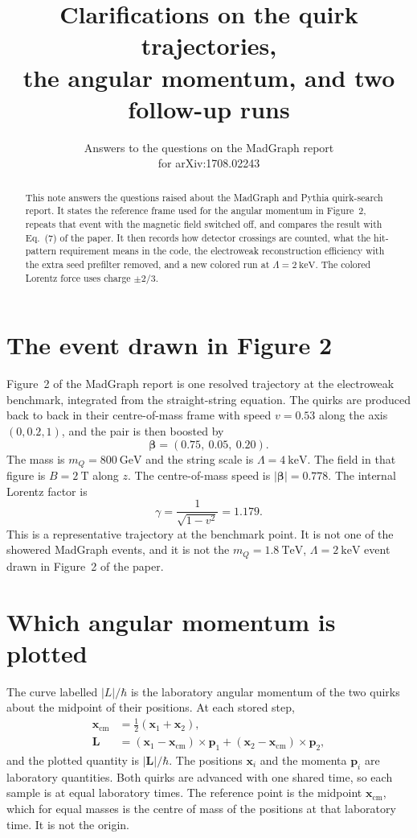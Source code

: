 \documentclass[11pt,a4paper]{article}
\title{Clarifications on the quirk trajectories,\\ the angular momentum, and two follow-up runs}
\author{Answers to the questions on the MadGraph report\\ for arXiv:1708.02243}
\date{}
\begin{document}
\maketitle

\begin{abstract}
This note answers the questions raised about the MadGraph and Pythia quirk-search report.
It states the reference frame used for the angular momentum in Figure~2, repeats that event with the magnetic field switched off, and compares the result with Eq.~(7) of the paper.
It then records how detector crossings are counted, what the hit-pattern requirement means in the code, the electroweak reconstruction efficiency with the extra seed prefilter removed, and a new colored run at \(\Lambda = \SI{2}{\keV}\).
The colored Lorentz force uses charge \(\pm 2/3\).
\end{abstract}

\section{The event drawn in Figure 2}
Figure~2 of the MadGraph report is one resolved trajectory at the electroweak benchmark, integrated from the straight-string equation.
The quirks are produced back to back in their centre-of-mass frame with speed \(v = 0.53\) along the axis \((0, 0.2, 1)\), and the pair is then boosted by
\[
\boldsymbol{\beta} = (0.75,\ 0.05,\ 0.20).
\]
The mass is \(m_Q = \SI{800}{\GeV}\) and the string scale is \(\Lambda = \SI{4}{\keV}\).
The field in that figure is \(B = \SI{2}{\tesla}\) along \(z\).
The centre-of-mass speed is \(|\boldsymbol{\beta}| = 0.778\).
The internal Lorentz factor is
\[
\gamma = \frac{1}{\sqrt{1-v^2}} = 1.179.
\]
This is a representative trajectory at the benchmark point.
It is not one of the showered MadGraph events, and it is not the \(m_Q = \SI{1.8}{\TeV}\), \(\Lambda = \SI{2}{\keV}\) event drawn in Figure~2 of the paper.

\section{Which angular momentum is plotted}
The curve labelled \(|L|/\hbar\) is the laboratory angular momentum of the two quirks about the midpoint of their positions.
At each stored step,
\begin{equation}
\begin{aligned}
\mathbf{x}_{\mathrm{cm}} &= \tfrac{1}{2}(\mathbf{x}_1+\mathbf{x}_2), \\
\mathbf{L} &= (\mathbf{x}_1-\mathbf{x}_{\mathrm{cm}})\times\mathbf{p}_1
            + (\mathbf{x}_2-\mathbf{x}_{\mathrm{cm}})\times\mathbf{p}_2,
\end{aligned}
\label{eq:Llab}
\end{equation}
and the plotted quantity is \(|\mathbf{L}|/\hbar\).
The positions \(\mathbf{x}_i\) and the momenta \(\mathbf{p}_i\) are laboratory quantities.
Both quirks are advanced with one shared time, so each sample is at equal laboratory times.
The reference point is the midpoint \(\mathbf{x}_{\mathrm{cm}}\), which for equal masses is the centre of mass of the positions at that laboratory time.
It is not the origin.
\end{document}

